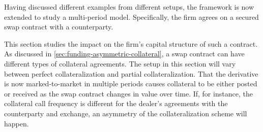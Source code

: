 \documentclass[main.tex]{subfiles}
\begin{document}
    Having discussed different examples from different setups,
    the framework is now extended to study a multi-period model.
    Specifically, the firm agrees on a secured swap contract with a counterparty.
    
    This section studies the impact on the firm's capital structure of such a contract.
    As discussed in \cref{sec:funding-asymmetric-collateral}, a swap contract can have different types of collateral agreements.
    The setup in this section will vary between perfect collateralization and partial collateralization.
    That the derivative is now marked-to-market in multiple periods causes collateral to be either posted or received as the swap contract changes in value over time.
    If, for instance, the collateral call frequency is different for the dealer's agreements with the counterparty and exchange, an asymmetry of the collateralization scheme will happen.

\end{document}
